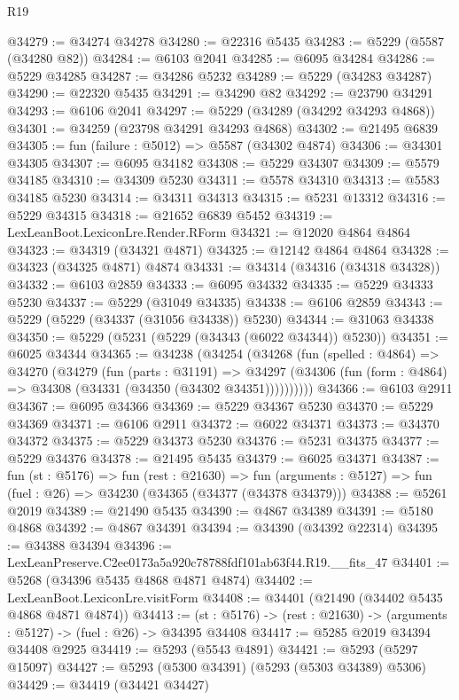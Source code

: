 \begin{lexlean}{R19}
\begin{coremodule}
@34279 := @34274 @34278
@34280 := @22316 @5435
@34283 := @5229 (@5587 (@34280 @82))
@34284 := @6103 @2041
@34285 := @6095 @34284
@34286 := @5229 @34285
@34287 := @34286 @5232
@34289 := @5229 (@34283 @34287)
@34290 := @22320 @5435
@34291 := @34290 @82
@34292 := @23790 @34291
@34293 := @6106 @2041
@34297 := @5229 (@34289 (@34292 @34293 @4868))
@34301 := @34259 (@23798 @34291 @34293 @4868)
@34302 := @21495 @6839
@34305 := fun (failure : @5012) => @5587 (@34302 @4874)
@34306 := @34301 @34305
@34307 := @6095 @34182
@34308 := @5229 @34307
@34309 := @5579 @34185
@34310 := @34309 @5230
@34311 := @5578 @34310
@34313 := @5583 @34185 @5230
@34314 := @34311 @34313
@34315 := @5231 @13312
@34316 := @5229 @34315
@34318 := @21652 @6839 @5452
@34319 := LexLeanBoot.LexiconLre.Render.RForm
@34321 := @12020 @4864 @4864
@34323 := @34319 (@34321 @4871)
@34325 := @12142 @4864 @4864
@34328 := @34323 (@34325 @4871) @4874
@34331 := @34314 (@34316 (@34318 @34328))
@34332 := @6103 @2859
@34333 := @6095 @34332
@34335 := @5229 @34333 @5230
@34337 := @5229 (@31049 @34335)
@34338 := @6106 @2859
@34343 := @5229 (@5229 (@34337 (@31056 @34338)) @5230)
@34344 := @31063 @34338
@34350 := @5229 (@5231 (@5229 (@34343 (@6022 @34344)) @5230))
@34351 := @6025 @34344
@34365 := @34238
    (@34254
      (@34268
        (fun (spelled : @4864) =>
        @34270
          (@34279
            (fun (parts : @31191) =>
            @34297 (@34306 (fun (form : @4864) => @34308 (@34331 (@34350 (@34302 @34351))))))))))
@34366 := @6103 @2911
@34367 := @6095 @34366
@34369 := @5229 @34367 @5230
@34370 := @5229 @34369
@34371 := @6106 @2911
@34372 := @6022 @34371
@34373 := @34370 @34372
@34375 := @5229 @34373 @5230
@34376 := @5231 @34375
@34377 := @5229 @34376
@34378 := @21495 @5435
@34379 := @6025 @34371
@34387 := fun (st : @5176) =>
  fun (rest : @21630) =>
  fun (arguments : @5127) => fun (fuel : @26) => @34230 (@34365 (@34377 (@34378 @34379)))
@34388 := @5261 @2019
@34389 := @21490 @5435
@34390 := @4867 @34389
@34391 := @5180 @4868
@34392 := @4867 @34391
@34394 := @34390 (@34392 @22314)
@34395 := @34388 @34394
@34396 := LexLeanPreserve.C2ee0173a5a920c78788fdf101ab63f44.R19.__fits_47
@34401 := @5268 (@34396 @5435 @4868 @4871 @4874)
@34402 := LexLeanBoot.LexiconLre.visitForm
@34408 := @34401 (@21490 (@34402 @5435 @4868 @4871 @4874))
@34413 := (st : @5176) -> (rest : @21630) -> (arguments : @5127) -> (fuel : @26) -> @34395 @34408
@34417 := @5285 @2019 @34394 @34408 @2925
@34419 := @5293 (@5543 @4891)
@34421 := @5293 (@5297 @15097)
@34427 := @5293 (@5300 @34391) (@5293 (@5303 @34389) @5306)
@34429 := @34419 (@34421 @34427)

\end{coremodule}
\end{lexlean}
